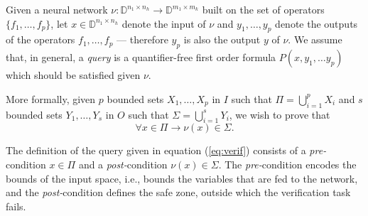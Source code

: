 Given a neural network $\nu : \mathbb{D}^{n_{1} \times n_h} \to
\mathbb{D}^{m_{1} \times m_k}$ built on the set of operators $\{f_1,
\ldots, f_p\}$, let $x \in \mathbb{D}^{n_{1} \times n_h}$ denote
the input of $\nu$ and $y_1, \ldots, y_p$ denote the outputs of the
operators $f_1, \ldots, f_p$ --- therefore $y_p$ is also the output
$y$ of $\nu$. We assume that, in general, a \emph{query} is a quantifier-free
first order formula $P(x, y_1, \ldots y_p)$ which should be satisfied given 
$\nu$.

More formally, given $p$ bounded sets $X_1, \ldots, X_p$ in $I$ 
such that $\Pi = \bigcup_{i=1}^p X_i$ and $s$ bounded sets $Y_1, 
\ldots, Y_s$ in $O$ such that $\Sigma = \bigcup_{i=1}^s Y_i$, we wish
to prove that  
\begin{equation}
	\label{eq:verif}
	\forall x \in \Pi \rightarrow \nu(x) \in \Sigma.
\end{equation}

The definition of the query given in equation (\ref{eq:verif})
consists of a \textit{pre-}condition $x \in \Pi$ and a 
\textit{post-}condition $\nu(x) \in \Sigma$. The 
\textit{pre-}condition encodes the bounds of the input space, i.e.,
bounds the variables that are fed to the network, and the 
\textit{post-}condition defines the safe zone, outside which the 
verification task fails.

\usetikzlibrary{
    arrows.meta,    %
    positioning,    %
    shapes.geometric, %
    trees           %
}


